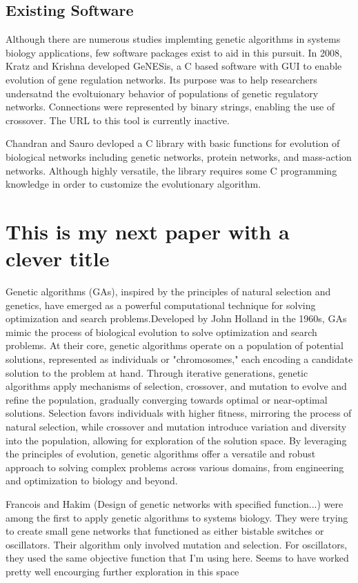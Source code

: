 \documentclass[12pt]{report}
\begin{document}
\section{Existing Software}

Although there are numerous studies implemting genetic algorithms in systems biology applications, few software packages exist to aid in this pursuit. In 2008, Kratz and Krishna developed GeNESis, a C based software with GUI to enable evolution of gene regulation networks. Its purpose was to help researchers undersatnd the evoltuionary behavior of populations of genetic regulatory networks. Connections were represented by binary strings, enabling the use of crossover. The URL to this tool is currently inactive.

Chandran and Sauro devloped a C library with basic functions for evolution of biological networks including genetic networks, protein networks, and mass-action networks. Although highly versatile, the library requires some C programming knowledge in order to customize the evolutionary algorithm.

\chapter{This is my next paper with a clever title}
Genetic algorithms (GAs), inspired by the principles of natural selection and genetics, have emerged as a powerful computational technique for solving optimization and search problems.Developed by John Holland in the 1960s, GAs mimic the process of biological evolution to solve optimization and search problems. At their core, genetic algorithms operate on a population of potential solutions, represented as individuals or "chromosomes," each encoding a candidate solution to the problem at hand. Through iterative generations, genetic algorithms apply mechanisms of selection, crossover, and mutation to evolve and refine the population, gradually converging towards optimal or near-optimal solutions. Selection favors individuals with higher fitness, mirroring the process of natural selection, while crossover and mutation introduce variation and diversity into the population, allowing for exploration of the solution space. By leveraging the principles of evolution, genetic algorithms offer a versatile and robust approach to solving complex problems across various domains, from engineering and optimization to biology and beyond.



Francois and Hakim (Design of genetic networks with specified function...) were among the first to apply genetic algorithms to systems biology. They were trying to create small gene networks that functioned as either bistable switches or oscillators. Their algorithm only involved mutation and selection. For oscillators, they used the same objective function that I'm using here. Seems to have worked pretty well encourging further exploration in this space
\end{document}
